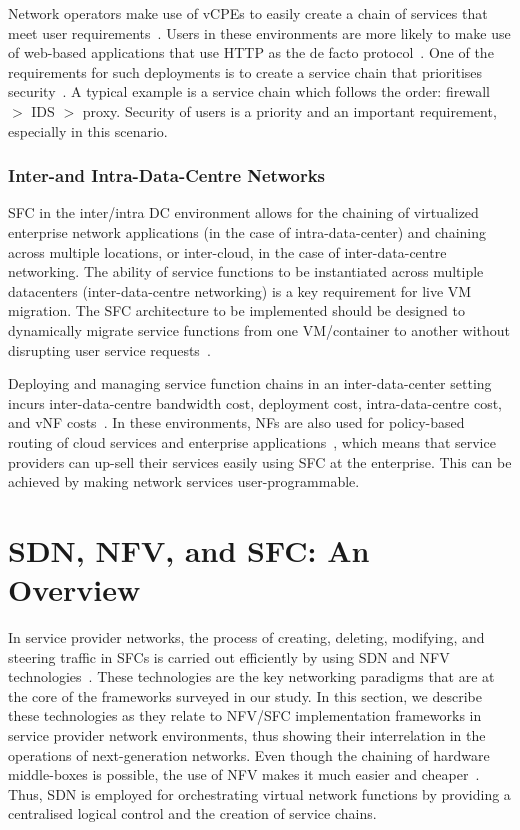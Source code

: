 \documentclass[futureinternet,review,accept,pdftex,moreauthors]{Definitions/mdpi}
\begin{document}
Network operators make use of vCPEs to easily create a chain of services that meet user requirements~\cite{cunha2016policy}. Users in these environments are more likely to make use of web-based applications that use HTTP as the de facto protocol~\cite{shojafar2019recent}. One of the requirements for such deployments is to create a service chain that prioritises security~\cite{yan2016security}. A typical example is a service chain which follows the order: firewall $>$ IDS $>$ proxy. Security of users is a priority and an important requirement, especially in this scenario.

\subsubsection{Inter-and Intra-Data-Centre Networks}
SFC in the inter/intra DC environment allows for the chaining of virtualized enterprise network applications (in the case of intra-data-center) and chaining across multiple locations, or inter-cloud, in the case of inter-data-centre networking. The ability of service functions to be instantiated across multiple datacenters (inter-data-centre networking) is a key requirement for live VM migration. The SFC architecture to be implemented should be designed to dynamically migrate service functions from one VM/container to another without disrupting user service requests~\cite{liu2021disaster}. 

Deploying and managing service function chains in an inter-data-center setting incurs inter-data-centre bandwidth cost, deployment cost, intra-data-centre cost, and vNF costs~\cite{zhong2018service}. In these environments, NFs are also used for policy-based routing of cloud services and enterprise applications~\cite{gronsund2015solution}, which means that service providers can up-sell their services easily using SFC at the enterprise. This can be achieved by making network services user-programmable.



\section{SDN, NFV, and SFC: An Overview} 
\label{SDN-NFV-SFC}
In service provider networks, the process of creating, deleting, modifying, and steering traffic in SFCs is carried out efficiently by using SDN and NFV technologies~\cite{medhat2016resilient}. These technologies are the key networking paradigms that are at the core of the frameworks surveyed in our study. In this section, we describe these technologies as they relate to NFV/SFC implementation frameworks in service provider network environments, thus showing their interrelation in the operations of next-generation networks. Even though the chaining of hardware middle-boxes is possible, the use of NFV makes it much easier and cheaper~\cite{sarmiento2021decentralized}. Thus, SDN is employed for orchestrating virtual network functions by providing a centralised logical control and the creation of service chains.
\end{document}
